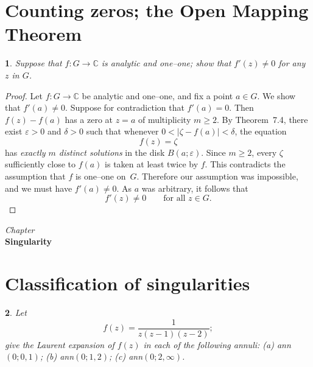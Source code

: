 \documentclass[12pt, a4paper]{report}
\newcommand{\chapter}[1]{%
  \par\vspace{2em}%
  \refstepcounter{section}%
  \begin{center}
    \textit{Chapter \thesection} \\[1.5ex]
    \textbf{#1}
  \end{center}
  \vspace{1em}%
}
\theoremstyle{spaced}
\newtheorem{exercise}{}
\newcommand{\setexercise}[1]{\setcounter{exercise}{#1-1}}
\begin{document}
\section{Counting zeros; the Open Mapping Theorem}
\setexercise{4}
\begin{exercise}
	Suppose that $f : G \to \mathbb{C}$ is analytic and one--one; show that $f'(z) \neq 0$ for any $z$ in $G$.
\end{exercise}

\begin{proof}
	Let $f : G \to \mathbb{C}$ be analytic and one--one, and fix a point
	$a \in G$.  We show that $f'(a) \neq 0$.
	Suppose for contradiction that $f'(a)=0$.
	Then $f(z)-f(a)$ has a zero at $z=a$ of multiplicity $m \ge 2$.
	By Theorem~7.4, there exist $\varepsilon>0$ and $\delta>0$ such that
	whenever $0<|\zeta - f(a)| < \delta$, the equation
	\[
		f(z)=\zeta
	\]
	has \emph{exactly $m$ distinct solutions} in the disk $B(a;\varepsilon)$.
	Since $m\ge 2$, every $\zeta$ sufficiently close to $f(a)$ is taken at
	least twice by $f$.
	This contradicts the assumption that $f$ is one--one on~$G$.
	Therefore our assumption was impossible, and we must have $f'(a) \neq 0$.
	As $a$ was arbitrary, it follows that
	\[
		f'(z) \neq 0 \qquad \text{for all } z \in G.
	\]
\end{proof}

\chapter{Singularity}
\section{Classification of singularities}
\setexercise{4}
\begin{exercise}
	Let
	\[
		f(z)=\frac{1}{z(z-1)(z-2)};
	\]
	give the Laurent expansion of \(f(z)\) in each of the following annuli:
	(a) ann\((0;0,1)\);
	(b) ann\((0;1,2)\);
	(c) ann\((0;2,\infty)\).
\end{exercise}
\end{document}

